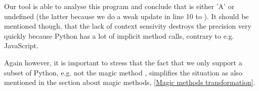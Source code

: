 Our tool is able to analyse this program and conclude that  is either 'A' or undefined (the latter because we do a weak update in line 10 to ). It should be mentioned though, that the lack of context sensivity destroys the precision very quickly because Python has a lot of implicit method calls, contrary to e.g. JavaScript.

Again however, it is important to stress that the fact that we only support a subset of Python, e.g. not the magic method , simplifies the situation as also mentioned in the section about magic methods, \ref{Magic methods transformation}.
